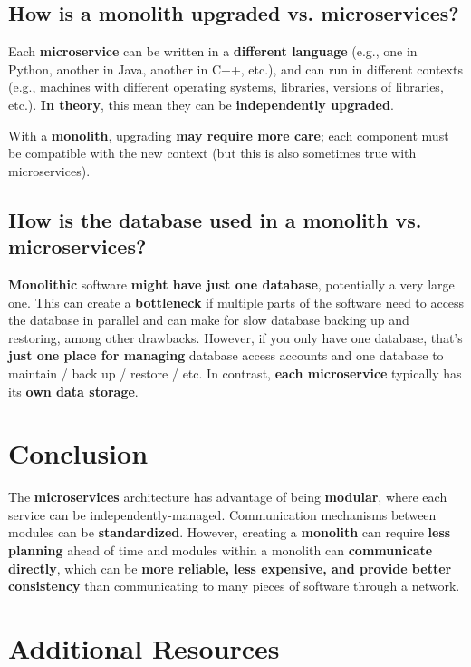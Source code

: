 \subsection{How is a monolith upgraded vs. microservices?}

Each \textbf{microservice} can be written in a \textbf{different language} (e.g., one in Python, another in Java, another in C++, etc.), and can run in different contexts (e.g., machines with different operating systems, libraries, versions of libraries, etc.). \textbf{In theory}, this mean they can be \textbf{independently upgraded}.

With a \textbf{monolith}, upgrading \textbf{may require more care}; each component must be compatible with the new context (but this is also sometimes true with microservices).

\subsection{How is the database used in a monolith vs. microservices?}

\textbf{Monolithic} software \textbf{might have just one database}, potentially a very large one. This can create a \textbf{bottleneck} if multiple parts of the software need to access the database in parallel and can make for slow database backing up and restoring, among other drawbacks. However, if you only have one database, that's \textbf{just one place for managing} database access accounts and one database to maintain / back up / restore / etc. In contrast, \textbf{each microservice} typically has its \textbf{own data storage}.

\section{Conclusion}
The \textbf{microservices} architecture has advantage of being \textbf{modular}, where each service can be independently-managed. Communication mechanisms between modules can be \textbf{standardized}. However, creating a \textbf{monolith} can require \textbf{less planning} ahead of time and modules within a monolith can \textbf{communicate directly}, which can be \textbf{more reliable, less expensive, and provide better consistency} than communicating to many pieces of software through a network.

\section{Additional Resources}

